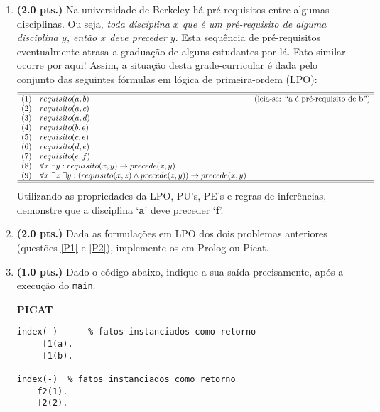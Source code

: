 \documentclass[a4paper,11pt]{article}
\begin{document}
\begin{enumerate}
\item  \label{P2} {\bf (2.0 pts.)} Na universidade de Berkeley há pré-requisitos entre algumas disciplinas.
Ou seja, \textit{toda disciplina $x$ que é um pré-requisito de alguma disciplina $y$, 
então $x$ deve preceder $y$}. Esta sequência
 de pré-requisitos eventualmente atrasa a graduação de alguns estudantes por lá. Fato similar ocorre por aqui!
 Assim, a situação desta grade-curricular é dada pelo 
 conjunto das seguintes fórmulas em lógica de primeira-ordem (LPO):
\\
  $$\begin{array}{llr} \hline\hline
	(1) & requisito(a, b) & (\text{leia-se: ``a é pré-requisito de b''}) \\
	(2) & requisito(a, c) &  \\
	(3) & requisito(a, d) &  \\
	(4) & requisito(b, e) &  \\
	(5) & requisito(c, e) & \\
			(6) & requisito(d, e) & \\
				(7) & requisito( e, f) & \\
	(8) & \forall x ~\exists y: requisito(x, y) \rightarrow precede(x, y) & \\
	(9) & \forall x ~\exists z ~\exists y: (requisito(x, z) \wedge precede(z, y)) \rightarrow precede(x,y) &\\
	\hline\hline
	\end{array}$$	
 Utilizando as propriedades da LPO, PU's, PE's e regras de inferências, 
 demonstre que a disciplina  \/`\textbf{a}' \/ deve preceder \/`\textbf{f}'.

\item {\bf (2.0 pts.)} Dada as formulações
em LPO dos dois problemas anteriores (questões \ref{P1} e  \ref{P2}), 
 implemente-os em Prolog ou Picat.
  
\item {\bf (1.0 pts.)} Dado o código abaixo, indique a sua saída precisamente, após
  a execução do \texttt{main}. 

\begin{minipage}{0.45\textwidth}
\begin{tiny}
\begin{center}{\bf PICAT}\end{center}
\begin{verbatim}
index(-)      % fatos instanciados como retorno
     f1(a).
     f1(b).
	
index(-)  % fatos instanciados como retorno
    f2(1).
    f2(2).
	

\end{verbatim}
\end{tiny}
\end{minipage}
\end{enumerate}
\end{document}

